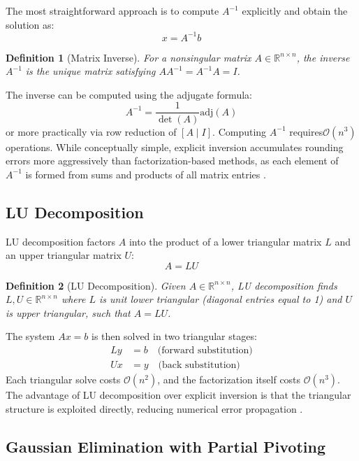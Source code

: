 \documentclass[12pt,a4paper]{report}
\newtheorem{definition}{Definition}[chapter]
\begin{document}
The most straightforward approach is to compute \( A^{-1} \) explicitly and obtain the solution as:
\[
    x = A^{-1} b
\]

\begin{definition}[Matrix Inverse]
    For a nonsingular matrix \( A \in \mathbb{R}^{n \times n} \), the inverse \( A^{-1} \) is the unique matrix satisfying \( A A^{-1} = A^{-1} A = I \).
\end{definition}

The inverse can be computed using the adjugate formula:
\[
    A^{-1} = \frac{1}{\det(A)} \text{adj}(A)
\]
or more practically via row reduction of \( [A \mid I] \). Computing \( A^{-1} \) requires\( \mathcal{O}(n^3) \) operations. While conceptually simple, explicit inversion accumulates rounding errors more aggressively than factorization-based methods, as each element of \( A^{-1} \) is formed from sums and products of all matrix entries \parencite{anton2014elementary}.

\subsection{LU Decomposition}

LU decomposition factors \( A \) into the product of a lower triangular matrix
\( L \) and an upper triangular matrix \( U \):
\[
    A = LU
\]

\begin{definition}[LU Decomposition]
    Given \( A \in \mathbb{R}^{n \times n} \), LU decomposition finds
    \( L, U \in \mathbb{R}^{n \times n} \) where \( L \) is unit lower triangular
    (diagonal entries equal to 1) and \( U \) is upper triangular, such that
    \( A = LU \).
\end{definition}

The system \( Ax = b \) is then solved in two triangular stages:
\begin{align*}
    Ly &= b \quad \text{(forward substitution)} \\
    Ux &= y \quad \text{(back substitution)}
\end{align*}
Each triangular solve costs \( \mathcal{O}(n^2) \), and the factorization itself costs \( \mathcal{O}(n^3) \). The advantage of LU decomposition over explicit inversion is that the triangular structure is exploited directly, reducing numerical error propagation \parencite{anton2014elementary}.

\subsection{Gaussian Elimination with Partial Pivoting}
\end{document}

